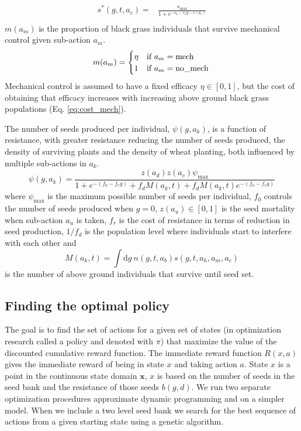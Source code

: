 \documentclass[12pt, a4paper]{article}
\begin{document}
\begin{align}\label{eq:survival_noherb}
	s^*(g, t, a_c) =& \frac{s_\text{max}}{1 + e^{-s_0 - s_rg - c(a_c)}}\\
\end{align}
$m(a_m)$ is the proportion of black grass individuals that survive mechanical control given sub-action $a_m$.
\begin{equation}
	m(a_m) = \begin{cases}
		\eta &\text{if}~a_m = \text{mech}\\
		1 &\text{if}~a_m = \text{no\_mech}
	\end{cases}\\
\end{equation}
Mechanical control is assumed to have a fixed efficacy $\eta \in [0, 1]$, but the cost of obtaining that efficacy increases with increasing above ground black grass populations (Eq. \ref{eq:cost_mech}).

The number of seeds produced per individual, $\psi(g, a_k)$, is a function of resistance, with greater resistance reducing the number of seeds produced, the density of surviving plants and the density of wheat planting, both influenced by multiple sub-actions in $a_k$. 
\begin{equation}\label{eq:seed_production}
	\psi(g, a_k) = \frac{z(a_d)z(a_c)\psi_\text{max}}{1 + e^{-(f_0 - f_rg)} + f_d M(a_k, t) + f_dM(a_k, t) e^{-(f_0 - f_rg)}}
\end{equation}  
where $\psi_\text{max}$ is the maximum possible number of seeds per individual, $f_0$ controls the number of seeds produced when $g = 0$, $z(a_u) \in [0, 1]$ is the seed mortality when sub-action $a_u$ is taken, $f_r$ is the cost of resistance in terms of reduction in seed production, $1/f_d$ is the population level where individuals start to interfere with each other and 
\begin{equation}\label{eq:num_ind}
	M(a_k, t) = \int \text{d}g~n(g, t, a_b)s(g, t, a_h, a_m, a_c)  
\end{equation}
is the number of above ground individuals that survive until seed set.

\subsection{Finding the optimal policy}
The goal is to find the set of actions for a given set of states (in optimization research called a policy and denoted with $\pi$) that maximize the value of the discounted cumulative reward function. The immediate reward function $R(x, a)$ gives the immediate reward of being in state $x$ and taking action $a$. State $x$ is a point in the continuous state domain $\mathbf{x}$, $x$ is based on the number of seeds in the seed bank and the resistance of those seeds $b(g, d)$. We run two separate optimization procedures approximate dynamic programming and on a simpler model. When we include a two level seed bank we search for the best sequence of actions from a given starting state using a genetic algorithm.       
\end{document}
